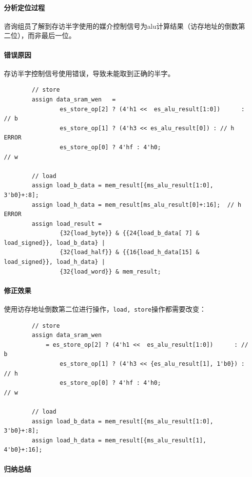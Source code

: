 \documentclass[UTF-8,twoside,c5size]{ctexart}
\begin{document}
	\paragraph{分析定位过程}\hfill
	
	咨询组员了解到存访半字使用的媒介控制信号为alu计算结果（访存地址的倒数第二位），而非最后一位。
	
	\paragraph{错误原因}\hfill
	
	存访半字控制信号使用错误，导致未能取到正确的半字。
	
	\begin{lstlisting}
		// store
		assign data_sram_wen   = 
				es_store_op[2] ? (4'h1 <<  es_alu_result[1:0])      : // b
				es_store_op[1] ? (4'h3 << es_alu_result[0]) : // h ERROR
				es_store_op[0] ? 4'hf : 4'h0;                          // w
		
		// load
		assign load_b_data = mem_result[{ms_alu_result[1:0], 3'b0}+:8];
		assign load_h_data = mem_result[ms_alu_result[0]+:16];	// h ERROR
		assign load_result = 
				{32{load_byte}} & {{24{load_b_data[ 7] & load_signed}}, load_b_data} |
				{32{load_half}} & {{16{load_h_data[15] & load_signed}}, load_h_data} |
				{32{load_word}} & mem_result;
	\end{lstlisting}
	
	\paragraph{修正效果}\hfill
	
	使用访存地址倒数第二位进行操作，\texttt{load, store}操作都需要改变：
	
	\begin{lstlisting}
		// store
		assign data_sram_wen 
			= es_store_op[2] ? (4'h1 <<  es_alu_result[1:0])      : // b
				es_store_op[1] ? (4'h3 << {es_alu_result[1], 1'b0}) : // h
				es_store_op[0] ? 4'hf : 4'h0;                          // w
												 
		// load
		assign load_b_data = mem_result[{ms_alu_result[1:0], 3'b0}+:8];
		assign load_h_data = mem_result[{ms_alu_result[1],   4'b0}+:16];
	\end{lstlisting}
	
	\paragraph{归纳总结}\hfill
	
\end{document}
